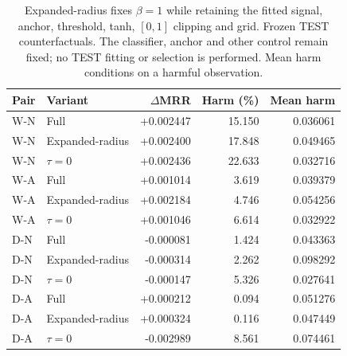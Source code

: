 \begin{table}[htbp]
\centering\small
\caption{Expanded-radius fixes $\beta=1$ while retaining the fitted signal, anchor, threshold, tanh, $[0,1]$ clipping and grid. Frozen TEST counterfactuals. The classifier, anchor and other control remain fixed; no TEST fitting or selection is performed. Mean harm conditions on a harmful observation.}
\label{tab:rerun-ablation}
\begin{tabular}{llrrr}
\toprule
Pair & Variant & $\Delta$MRR & Harm (\%) & Mean harm\\
\midrule
W-N & Full & +0.002447 & 15.150 & 0.036061\\
W-N & Expanded-radius & +0.002400 & 17.848 & 0.049465\\
W-N & $\tau=0$ & +0.002436 & 22.633 & 0.032716\\
W-A & Full & +0.001014 & 3.619 & 0.039379\\
W-A & Expanded-radius & +0.002184 & 4.746 & 0.054256\\
W-A & $\tau=0$ & +0.001046 & 6.614 & 0.032922\\
D-N & Full & -0.000081 & 1.424 & 0.043363\\
D-N & Expanded-radius & -0.000314 & 2.262 & 0.098292\\
D-N & $\tau=0$ & -0.000147 & 5.326 & 0.027641\\
D-A & Full & +0.000212 & 0.094 & 0.051276\\
D-A & Expanded-radius & +0.000324 & 0.116 & 0.047449\\
D-A & $\tau=0$ & -0.002989 & 8.561 & 0.074461\\
\bottomrule
\end{tabular}
\end{table}
